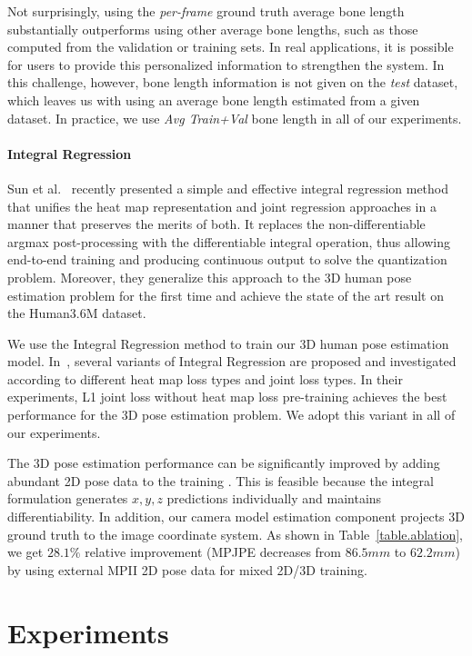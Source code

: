 \documentclass[runningheads]{llncs}
\begin{document}
Not surprisingly, using the \emph{per-frame} ground truth average bone length substantially outperforms using other average bone lengths, such as those computed from the validation or training sets. In real applications, it is possible for users to provide this personalized information to strengthen the system. In this challenge, however, bone length information is not given on the \emph{test} dataset, which leaves us with using an average bone length estimated from a given dataset. In practice, we use \emph{Avg Train+Val} bone length in all of our experiments.

\paragraph{\textbf{Integral Regression}} Sun et al.~\cite{sun2017integral} recently presented a simple and effective integral regression method that unifies the heat map representation and joint regression approaches in a manner that preserves the merits of both. It replaces the non-differentiable argmax post-processing with the differentiable integral operation, thus allowing end-to-end training and producing continuous output to solve the quantization problem. Moreover, they generalize this approach to the 3D human pose estimation problem for the first time and achieve the state of the art result on the Human3.6M dataset.

We use the Integral Regression method to train our 3D human pose estimation model. In~\cite{sun2017integral}, several variants of Integral Regression are proposed and investigated according to different heat map loss types and joint loss types. In their experiments, L1 joint loss without heat map loss pre-training achieves the best performance for the 3D pose estimation problem. We adopt this variant in all of our experiments. 

The 3D pose estimation performance can be significantly improved by adding abundant 2D pose data to the training \cite{sun2017integral,sun2017compositional}. This is feasible because the integral formulation generates $x,y,z$ predictions individually and maintains differentiability. In addition, our camera model estimation component projects 3D ground truth to the image coordinate system. As shown in Table~\ref{table.ablation}, we get $28.1\%$ relative improvement (MPJPE decreases from $86.5 mm$ to $62.2 mm$) by using external MPII 2D pose data for mixed 2D/3D training.

\section{Experiments}
\label{sec.imp}
\end{document}
